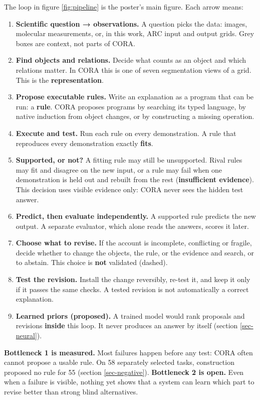 \documentclass[11pt, a4paper]{article}
\begin{document}
The loop in figure \ref{fig:pipeline} is the poster's main figure. Each arrow means:

\begin{enumerate}
\item \textbf{Scientific question → observations.} A question picks the data: images, molecular measurements, or, in this work, ARC
input and output grids. Grey boxes are context, not parts of CORA.
\item \textbf{Find objects and relations.} Decide what counts as an object and which relations matter. In CORA this is one of seven
segmentation views of a grid. This is the \textbf{representation}.
\item \textbf{Propose executable rules.} Write an explanation as a program that can be run: a \textbf{rule}. CORA proposes programs by
searching its typed language, by native induction from object changes, or by constructing a missing operation.
\item \textbf{Execute and test.} Run each rule on every demonstration. A rule that reproduces every demonstration exactly \textbf{fits}.
\item \textbf{Supported, or not?} A fitting rule may still be unsupported. Rival rules may fit and disagree on the new input, or a
rule may fail when one demonstration is held out and rebuilt from the rest (\textbf{insufficient evidence}). This decision
uses visible evidence only: CORA never sees the hidden test answer.
\item \textbf{Predict, then evaluate independently.} A supported rule predicts the new output. A separate evaluator, which alone
reads the answers, scores it later.
\item \textbf{Choose what to revise.} If the account is incomplete, conflicting or fragile, decide whether to change the objects,
the rule, or the evidence and search, or to abstain. This choice is \textbf{not} validated (dashed).
\item \textbf{Test the revision.} Install the change reversibly, re-test it, and keep it only if it passes the same checks. A
tested revision is not automatically a correct explanation.
\item \textbf{Learned priors (proposed).} A trained model would rank proposals and revisions \textbf{inside} this loop. It never
produces an answer by itself (section \ref{sec-neural}).
\end{enumerate}

\textbf{Bottleneck 1 is measured.} Most failures happen before any test: CORA often cannot propose a usable rule. On 58
separately selected tasks, construction proposed no rule for 55 (section \ref{sec-negative}). \textbf{Bottleneck 2 is open.} Even
when a failure is visible, nothing yet shows that a system can learn which part to revise better than strong blind
alternatives.
\end{document}
